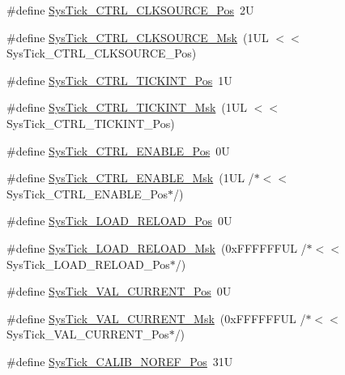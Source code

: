 \begin{DoxyCompactItemize}
\item 
\#define \hyperlink{group___c_m_s_i_s___sys_tick_ga24fbc69a5f0b78d67fda2300257baff1}{Sys\+Tick\+\_\+\+C\+T\+R\+L\+\_\+\+C\+L\+K\+S\+O\+U\+R\+C\+E\+\_\+\+Pos}~2U
\item 
\#define \hyperlink{group___c_m_s_i_s___sys_tick_gaa41d06039797423a46596bd313d57373}{Sys\+Tick\+\_\+\+C\+T\+R\+L\+\_\+\+C\+L\+K\+S\+O\+U\+R\+C\+E\+\_\+\+Msk}~(1\+U\+L $<$$<$ Sys\+Tick\+\_\+\+C\+T\+R\+L\+\_\+\+C\+L\+K\+S\+O\+U\+R\+C\+E\+\_\+\+Pos)
\item 
\#define \hyperlink{group___c_m_s_i_s___sys_tick_ga88f45bbb89ce8df3cd2b2613c7b48214}{Sys\+Tick\+\_\+\+C\+T\+R\+L\+\_\+\+T\+I\+C\+K\+I\+N\+T\+\_\+\+Pos}~1U
\item 
\#define \hyperlink{group___c_m_s_i_s___sys_tick_ga95bb984266ca764024836a870238a027}{Sys\+Tick\+\_\+\+C\+T\+R\+L\+\_\+\+T\+I\+C\+K\+I\+N\+T\+\_\+\+Msk}~(1\+U\+L $<$$<$ Sys\+Tick\+\_\+\+C\+T\+R\+L\+\_\+\+T\+I\+C\+K\+I\+N\+T\+\_\+\+Pos)
\item 
\#define \hyperlink{group___c_m_s_i_s___sys_tick_ga0b48cc1e36d92a92e4bf632890314810}{Sys\+Tick\+\_\+\+C\+T\+R\+L\+\_\+\+E\+N\+A\+B\+L\+E\+\_\+\+Pos}~0U
\item 
\#define \hyperlink{group___c_m_s_i_s___sys_tick_ga16c9fee0ed0235524bdeb38af328fd1f}{Sys\+Tick\+\_\+\+C\+T\+R\+L\+\_\+\+E\+N\+A\+B\+L\+E\+\_\+\+Msk}~(1\+U\+L /$\ast$$<$$<$ Sys\+Tick\+\_\+\+C\+T\+R\+L\+\_\+\+E\+N\+A\+B\+L\+E\+\_\+\+Pos$\ast$/)
\item 
\#define \hyperlink{group___c_m_s_i_s___sys_tick_gaf44d10df359dc5bf5752b0894ae3bad2}{Sys\+Tick\+\_\+\+L\+O\+A\+D\+\_\+\+R\+E\+L\+O\+A\+D\+\_\+\+Pos}~0U
\item 
\#define \hyperlink{group___c_m_s_i_s___sys_tick_ga265912a7962f0e1abd170336e579b1b1}{Sys\+Tick\+\_\+\+L\+O\+A\+D\+\_\+\+R\+E\+L\+O\+A\+D\+\_\+\+Msk}~(0x\+F\+F\+F\+F\+F\+F\+U\+L /$\ast$$<$$<$ Sys\+Tick\+\_\+\+L\+O\+A\+D\+\_\+\+R\+E\+L\+O\+A\+D\+\_\+\+Pos$\ast$/)
\item 
\#define \hyperlink{group___c_m_s_i_s___sys_tick_ga3208104c3b019b5de35ae8c21d5c34dd}{Sys\+Tick\+\_\+\+V\+A\+L\+\_\+\+C\+U\+R\+R\+E\+N\+T\+\_\+\+Pos}~0U
\item 
\#define \hyperlink{group___c_m_s_i_s___sys_tick_gafc77b56d568930b49a2474debc75ab45}{Sys\+Tick\+\_\+\+V\+A\+L\+\_\+\+C\+U\+R\+R\+E\+N\+T\+\_\+\+Msk}~(0x\+F\+F\+F\+F\+F\+F\+U\+L /$\ast$$<$$<$ Sys\+Tick\+\_\+\+V\+A\+L\+\_\+\+C\+U\+R\+R\+E\+N\+T\+\_\+\+Pos$\ast$/)
\item 
\#define \hyperlink{group___c_m_s_i_s___sys_tick_ga534dbe414e7a46a6ce4c1eca1fbff409}{Sys\+Tick\+\_\+\+C\+A\+L\+I\+B\+\_\+\+N\+O\+R\+E\+F\+\_\+\+Pos}~31U

\end{DoxyCompactItemize}
